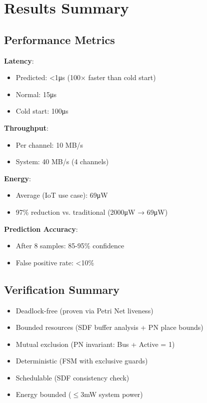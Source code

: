 \documentclass[conference]{IEEEtran}
\newcommand{\cmark}{\ding{51}}%
\begin{document}
\section{Results Summary}

\subsection{Performance Metrics}
\textbf{Latency}:
\begin{itemize}
    \item Predicted: <1μs (100× faster than cold start)
    \item Normal: 15μs
    \item Cold start: 100μs
\end{itemize}

\textbf{Throughput}:
\begin{itemize}
    \item Per channel: 10 MB/s
    \item System: 40 MB/s (4 channels)
\end{itemize}

\textbf{Energy}:
\begin{itemize}
    \item Average (IoT use case): 69μW
    \item 97\% reduction vs. traditional (2000μW → 69μW)
\end{itemize}

\textbf{Prediction Accuracy}:
\begin{itemize}
    \item After 8 samples: 85-95\% confidence
    \item False positive rate: <10\%
\end{itemize}

\subsection{Verification Summary}
\begin{itemize}
    \item[\cmark] Deadlock-free (proven via Petri Net liveness)
    \item[\cmark] Bounded resources (SDF buffer analysis + PN place bounds)
    \item[\cmark] Mutual exclusion (PN invariant: Bus + Active = 1)
    \item[\cmark] Deterministic (FSM with exclusive guards)
    \item[\cmark] Schedulable (SDF consistency check)
    \item[\cmark] Energy bounded ($\leq$3mW system power)
\end{itemize}
\end{document}
